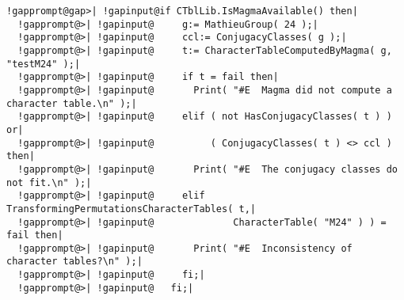 \documentclass[a4paper,11pt]{report}
\begin{document}
{{{ 
\begin{Verbatim}[commandchars=!@|,fontsize=\small,frame=single,label=Example]
  !gapprompt@gap>| !gapinput@if CTblLib.IsMagmaAvailable() then|
  !gapprompt@>| !gapinput@     g:= MathieuGroup( 24 );|
  !gapprompt@>| !gapinput@     ccl:= ConjugacyClasses( g );|
  !gapprompt@>| !gapinput@     t:= CharacterTableComputedByMagma( g, "testM24" );|
  !gapprompt@>| !gapinput@     if t = fail then|
  !gapprompt@>| !gapinput@       Print( "#E  Magma did not compute a character table.\n" );|
  !gapprompt@>| !gapinput@     elif ( not HasConjugacyClasses( t ) ) or|
  !gapprompt@>| !gapinput@          ( ConjugacyClasses( t ) <> ccl ) then|
  !gapprompt@>| !gapinput@       Print( "#E  The conjugacy classes do not fit.\n" );|
  !gapprompt@>| !gapinput@     elif TransformingPermutationsCharacterTables( t,|
  !gapprompt@>| !gapinput@              CharacterTable( "M24" ) ) = fail then|
  !gapprompt@>| !gapinput@       Print( "#E  Inconsistency of character tables?\n" );|
  !gapprompt@>| !gapinput@     fi;|
  !gapprompt@>| !gapinput@   fi;|
\end{Verbatim}
 }

 }

 }

    
\end{document}

